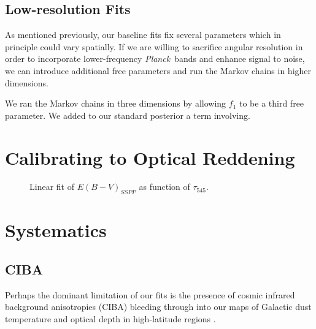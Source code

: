 \documentclass{emulateapj}
\newcommand{\PLANCK}{{\it Planck}}
\begin{document}

\subsection{Low-resolution Fits}
\label{sec:lores}

As mentioned previously, our baseline fits fix several parameters which
in principle could vary spatially. If we are willing to sacrifice angular
resolution in order to incorporate lower-frequency \PLANCK~bands and
enhance signal to noise, we can introduce additional free parameters
and run the Markov chains in higher dimensions.

We ran the Markov chains in three dimensions by allowing 
$f_1$ to be a third free parameter. We added to our standard posterior a 
term involving.

\section{Calibrating to Optical Reddening}
\label{sec:ebv}


\begin{figure}
\begin{center}
\caption{\label{fig:calib} Linear fit of $E(B-V)_{SSPP}$ as function of
$\tau_{545}$.}
\end{center}
\end{figure}


\section{Systematics}

\subsection{CIBA}
Perhaps the dominant limitation of our fits is the presence of cosmic
infrared background anisotropies (CIBA) bleeding through into our maps of 
Galactic dust temperature and optical depth in high-latitude regions 
\citep{ciba}.
\end{document}
